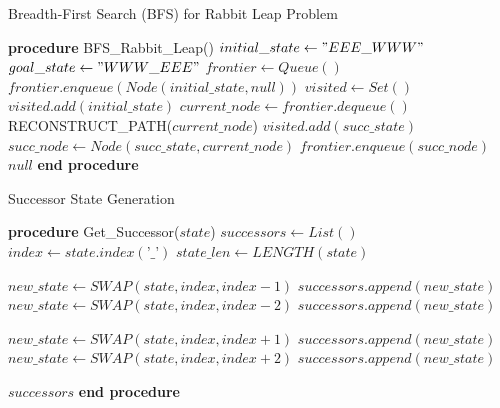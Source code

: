 \documentclass[conference]{IEEEtran}
\begin{document}
\begin{algorithm}
\caption{Breadth-First Search (BFS) for Rabbit Leap Problem}
\begin{algorithmic}[1]
\STATE \textbf{procedure} BFS\_Rabbit\_Leap()
\STATE $initial\_state \leftarrow "EEE\_WWW"$
\STATE $goal\_state \leftarrow "WWW\_EEE"$
\STATE $frontier \leftarrow Queue()$
\STATE $frontier.enqueue(Node(initial\_state, null))$
\STATE $visited \leftarrow Set()$
\STATE $visited.add(initial\_state)$
    \STATE $current\_node \leftarrow frontier.dequeue()$
        \RETURN RECONSTRUCT\_PATH($current\_node$)
    \ENDIF
            \STATE $visited.add(succ\_state)$
            \STATE $succ\_node \leftarrow Node(succ\_state, current\_node)$
            \STATE $frontier.enqueue(succ\_node)$
        \ENDIF
    \ENDFOR
\ENDWHILE
\RETURN $null$ 
\STATE \textbf{end procedure}
\end{algorithmic}
\end{algorithm}


\begin{algorithm}
\caption{Successor State Generation}
\begin{algorithmic}[1]
\STATE \textbf{procedure} Get\_Successor($state$)
\STATE $successors \leftarrow List()$
\STATE $index \leftarrow state.index(\texttt{'\_'})$
\STATE $state\_len \leftarrow LENGTH(state)$

    \STATE $new\_state \leftarrow SWAP(state, index, index-1)$
    \STATE $successors.append(new\_state)$
\ENDIF
{}
    \STATE $new\_state \leftarrow SWAP(state, index, index-2)$
    \STATE $successors.append(new\_state)$
\ENDIF

    \STATE $new\_state \leftarrow SWAP(state, index, index+1)$
    \STATE $successors.append(new\_state)$
\ENDIF
{}
    \STATE $new\_state \leftarrow SWAP(state, index, index+2)$
    \STATE $successors.append(new\_state)$
\ENDIF

\RETURN $successors$
\STATE \textbf{end procedure}
\end{algorithmic}
\end{algorithm}
\end{document}
